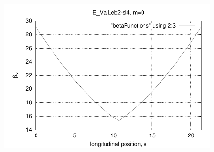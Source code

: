 \documentclass[t]{beamer}
\begin{document}
\begin{frame}{}
\begin{columns}
\begin{column}[t]{0.45\linewidth}
\begin{figure}[h]
\includegraphics[scale=0.48]{ETEAPOT_ValLeb2-sl4betax.pdf}
\end{figure}
\end{column}
\end{columns}
\end{frame}
\end{document}
